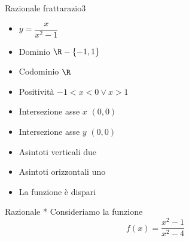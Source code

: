 \begin{funzionet}{Razionale fratta}{razio3}
	
	\tcblower
	\begin{itemize}
		\item $y=\dfrac{x}{x^2-1}$
		\item Dominio $\R-\lbrace-1,1\rbrace$
		\item Codominio $\R$
		\item Positività $-1<x<0\vee x>1$
		\item Intersezione asse $x$ $(0,0)$ 
		\item Intersezione asse $y$ $(0,0)$ 
		\item Asintoti verticali due
		\item Asintoti orizzontali uno
		\item La funzione è dispari
	\end{itemize}
\end{funzionet}
\begin{esempiot}{Razionale *}{}
	Consideriamo la funzione\[f(x)=\dfrac{x^2-1}{x^2-4} \]
\end{esempiot}
